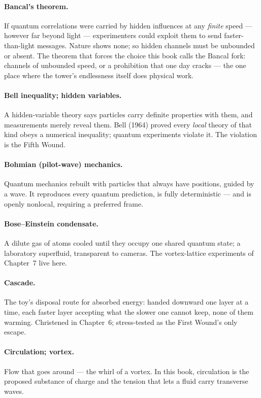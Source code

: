 \documentclass[fontsize=11pt,paper=a4,pagesize=auto,parskip=half-]{scrbook}
\begin{document}
\paragraph{Bancal's theorem.} If quantum correlations were carried by hidden influences at any \emph{finite} speed --- however far beyond light --- experimenters could exploit them to send faster-than-light messages. Nature shows none; so hidden channels must be unbounded or absent. The theorem that forces the choice this book calls the Bancal fork: channels of unbounded speed, or a prohibition that one day cracks --- the one place where the tower's endlessness itself does physical work.

\paragraph{Bell inequality; hidden variables.} A hidden-variable theory says particles carry definite properties with them, and measurements merely reveal them. Bell (1964) proved every \emph{local} theory of that kind obeys a numerical inequality; quantum experiments violate it. The violation is the Fifth Wound.

\paragraph{Bohmian (pilot-wave) mechanics.} Quantum mechanics rebuilt with particles that always have positions, guided by a wave. It reproduces every quantum prediction, is fully deterministic --- and is openly nonlocal, requiring a preferred frame.

\paragraph{Bose--Einstein condensate.} A dilute gas of atoms cooled until they occupy one shared quantum state; a laboratory superfluid, transparent to cameras. The vortex-lattice experiments of Chapter~7 live here.

\paragraph{Cascade.} The toy's disposal route for absorbed energy: handed downward one layer at a time, each faster layer accepting what the slower one cannot keep, none of them warming. Christened in Chapter~6; stress-tested as the First Wound's only escape.

\paragraph{Circulation; vortex.} Flow that goes around --- the whirl of a vortex. In this book, circulation is the proposed substance of charge and the tension that lets a fluid carry transverse waves.
\end{document}
